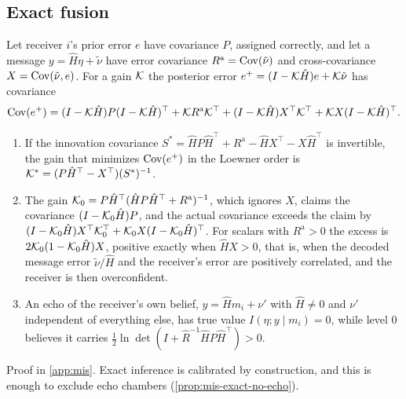 \subsection{Exact fusion}\label{sup:mis-exact-fusion}

\begin{proposition}\label{prop:mis-correlated-fusion}
Let receiver $i$'s prior error $e$ have covariance $P$, assigned correctly, and let a message $y=\hat H\eta+\tilde\nu$ have error covariance $R^{\mathrm a}=\operatorname{Cov}(\tilde\nu)$ and cross-covariance $X=\operatorname{Cov}(\tilde\nu,e)$. For a gain $\mathcal{K}$ the posterior error $e^+=(I-\mathcal{K}\hat H)e+\mathcal{K}\tilde\nu$ has covariance
\begin{equation}\label{eq:mis-joseph}
\operatorname{Cov}(e^+)=(I-\mathcal{K}\hat H)P(I-\mathcal{K}\hat H)^\top+\mathcal{K} R^{\mathrm a}\mathcal{K}^\top+(I-\mathcal{K}\hat H)X^\top\mathcal{K}^\top+\mathcal{K} X(I-\mathcal{K}\hat H)^\top.
\end{equation}
\begin{enumerate}
\item[(a)] If the innovation covariance $S^\ast=\hat HP\hat H^\top+R^{\mathrm a}-\hat HX^\top-X\hat H^\top$ is invertible, the gain that minimizes $\operatorname{Cov}(e^+)$ in the Loewner order is $\mathcal{K}^\ast=(P\hat H^\top-X^\top)(S^\ast)^{-1}$.
\item[(b)] The gain $\mathcal{K}_0=P\hat H^\top(\hat HP\hat H^\top+R^{\mathrm a})^{-1}$, which ignores $X$, claims the covariance $(I-\mathcal{K}_0\hat H)P$, and the actual covariance exceeds the claim by $(I-\mathcal{K}_0\hat H)X^\top\mathcal{K}_0^\top+\mathcal{K}_0X(I-\mathcal{K}_0\hat H)^\top$. For scalars with $R^{\mathrm a}>0$ the excess is $2\mathcal{K}_0(1-\mathcal{K}_0\hat H)X$, positive exactly when $\hat HX>0$, that is, when the decoded message error $\tilde\nu/\hat H$ and the receiver's error are positively correlated, and the receiver is then overconfident.
\item[(c)] An echo of the receiver's own belief, $y=\hat Hm_i+\nu'$ with $\hat H\neq0$ and $\nu'$ independent of everything else, has true value $I(\eta;y\mid m_i)=0$, while level 0 believes it carries $\tfrac12\ln\det(I+\hat R^{-1}\hat HP\hat H^\top)>0$.
\end{enumerate}
\end{proposition}

Proof in \cref{app:mis}. Exact inference is calibrated by construction, and this is enough to exclude echo chambers (\cref{prop:mis-exact-no-echo}).

